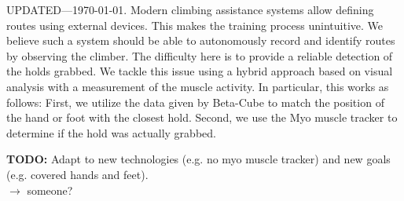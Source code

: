   UPDATED---\today. Modern climbing assistance systems allow defining routes using external devices. This makes the training process unintuitive. We believe such a system should be able to autonomously record and identify routes by observing the climber. The difficulty here is to provide a reliable detection of the holds grabbed. We tackle this issue using a hybrid approach based on visual analysis with a measurement of the muscle activity. In particular, this works as follows: First, we utilize the data given by Beta-Cube to match the position of the hand or foot with the closest hold. Second, we use the Myo muscle tracker to determine if the hold was actually grabbed.
  
  \textbf{TODO:} Adapt to new technologies (e.g. no myo muscle tracker) and new goals (e.g. covered hands and feet). \\
  $\rightarrow$ someone?
